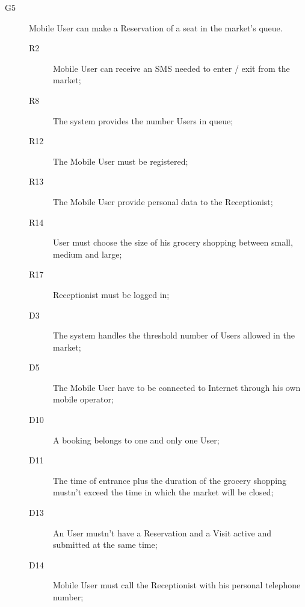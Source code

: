 \begin{description}
    \item[G5]Mobile User can make a Reservation of a seat in the market's queue.
    \begin{description}
    \item[R2] Mobile User can receive an SMS needed to enter / exit from the market;   %
    \item[R8] The system provides the number Users in queue; %
    \item[R12] The Mobile User must be registered; %
    \item[R13] The Mobile User provide personal data to the Receptionist; %
    \item[R14] User must choose the size of his grocery shopping between small, medium and large;
    \item[R17] Receptionist must be logged in;
    \item[D3] The system handles the threshold number of Users allowed in the market;
    \item[D5] The Mobile User have to be connected to Internet through his own mobile operator;
    \item[D10] A booking belongs to one and only one User;
    \item[D11] The time of entrance plus the duration of the grocery shopping mustn’t exceed the time in which the market will be closed; 
    \item[D13] An User mustn’t have a Reservation and a Visit active and submitted at the same time; 
    \item[D14] Mobile User must call the Receptionist with his personal telephone number;
    \end{description}
    

\end{description}
